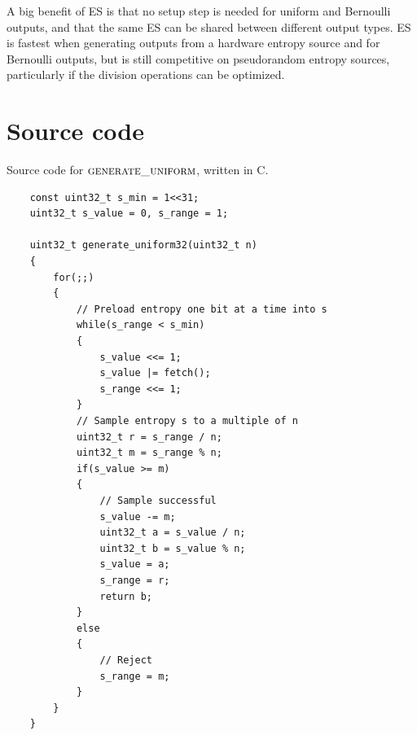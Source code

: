 \documentclass[12pt]{article}
\begin{document}
A big benefit of ES is that no setup step is needed for uniform and Bernoulli outputs, and that the same ES can be shared between different output types. ES is fastest when generating outputs from a hardware entropy source and for Bernoulli outputs, but is still competitive on pseudorandom entropy sources, particularly if the division operations can be optimized.



\printbibliography

\appendix

\section {Source code} \label{app:source-code}

Source code for $\textsc{generate\_uniform}$, written in C.

\begin{verbatim}
    const uint32_t s_min = 1<<31;
    uint32_t s_value = 0, s_range = 1;

    uint32_t generate_uniform32(uint32_t n)
    {
        for(;;)
        {
            // Preload entropy one bit at a time into s
            while(s_range < s_min)
            {
                s_value <<= 1;
                s_value |= fetch();
                s_range <<= 1;
            }
            // Sample entropy s to a multiple of n
            uint32_t r = s_range / n;
            uint32_t m = s_range % n;
            if(s_value >= m)
            {
                // Sample successful
                s_value -= m;
                uint32_t a = s_value / n;
                uint32_t b = s_value % n;
                s_value = a;
                s_range = r; 
                return b;
            }
            else
            {
                // Reject
                s_range = m;
            }
        }
    }
\end{verbatim}
\end{document}
